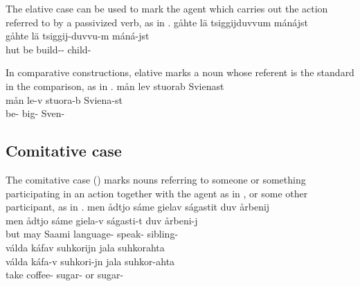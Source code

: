 The elative case can be used to mark the agent which carries out the action referred to by a passivized verb, as in .
\ea\label{elat5b}%
\glll	gåhte lä tsiggijduvvum {mánájst}\\
	gåhte lä tsiggij-duvvu-m máná-jst\\
	hut\BS{} be\BS{} build-- child-\\\nopagebreak
{}	
\z

In comparative constructions, elative marks a noun whose referent is the standard in the comparison, as in .
\ea\label{elat7}
\glll	mån lev stuorab {Svienast}\\
	mån le-v stuora-b Sviena-st\\
	 be- big- Sven-\\ %
 
\z


\subsection{Comitative case}\label{comitative}
The comitative case (\COMs) marks nouns referring to someone or something participating in an action together with the agent as in , or some other participant, as in .
\ea\label{com1}
\glll	men ådtjo sáme gielav ságastit duv {årbenij}\\
	men ådtjo sáme giela-v ságasti-t duv årbeni-j\\
	but may\BS{} Saami\BS{} language- speak-  sibling-\\\nopagebreak
{} 
\z
\ea\label{com1b}
\glll	válda káfav {suhkorijn} jala suhkorahta\\
	válda káfa-v suhkori-jn jala suhkor-ahta\\
	take\BS{} coffee- sugar- or sugar-\\\nopagebreak
{} 
\z

